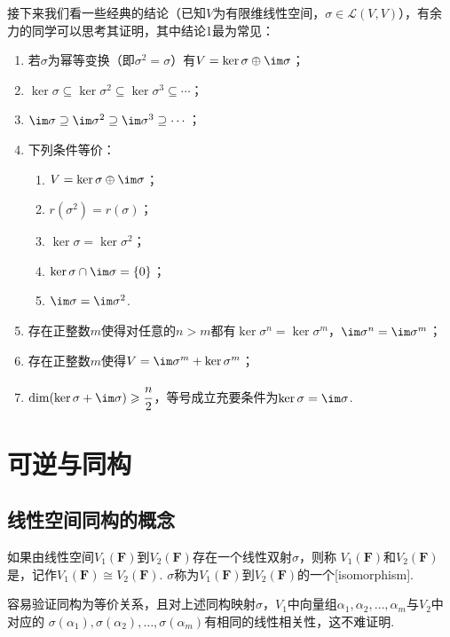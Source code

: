 接下来我们看一些经典的结论（已知$V$为有限维线性空间，$\sigma\in \mathcal{L}(V,V)$），有余力的同学可以思考其证明，其中结论1最为常见：

\begin{enumerate}
    \item 若$\sigma$为幂等变换（即$\sigma^2=\sigma$）有$V=\ker\sigma\oplus\im \sigma$；

    \item $\ker\sigma \subseteq \ker\sigma^2 \subseteq \ker\sigma^3 \subseteq \cdots$；

    \item $\im \sigma \supseteq \im \sigma^2 \supseteq \im \sigma^3 \supseteq \cdots$；

    \item 下列条件等价：
    \begin{enumerate}[label=(\arabic*)]
        \item $V=\ker\sigma\oplus\im \sigma$；
        \item $r(\sigma^2)=r(\sigma)$；
        \item $\ker\sigma=\ker\sigma^2$；
        \item $\ker\sigma \cap \im \sigma=\{0\}$；
        \item $\im \sigma=\im \sigma^2$.
    \end{enumerate}

    \item 存在正整数$m$使得对任意的$n>m$都有$\ker\sigma^n=\ker\sigma^m$，$\im \sigma^n=\im \sigma^m$；

    \item 存在正整数$m$使得$V=\im \sigma^m+\ker\sigma^m$；

    \item $\dim(\ker\sigma+\im \sigma) \geqslant \cfrac{n}{2}$，等号成立充要条件为$\ker\sigma=\im \sigma$.
\end{enumerate}

\section{可逆与同构}
\subsection{线性空间同构的概念}
\begin{definition}
    如果由线性空间$V_1(\mathbf{F})$到$V_2(\mathbf{F})$存在一个线性双射$\sigma$，则称
    $V_1(\mathbf{F})$和$V_2(\mathbf{F})$是，记作$V_1(\mathbf{F}) \cong V_2(\mathbf{F})$.
    $\sigma$称为$V_1(\mathbf{F})$到$V_2(\mathbf{F})$的一个[isomorphism].
\end{definition}
容易验证同构为等价关系，且对上述同构映射$\sigma$，$V_1$中向量组$ \alpha_1,\alpha_2,\ldots,\alpha_m $与$V_2$中对应的
$ \sigma(\alpha_1),\sigma(\alpha_2),\ldots,\sigma(\alpha_m) $有相同的线性相关性，这不难证明.

